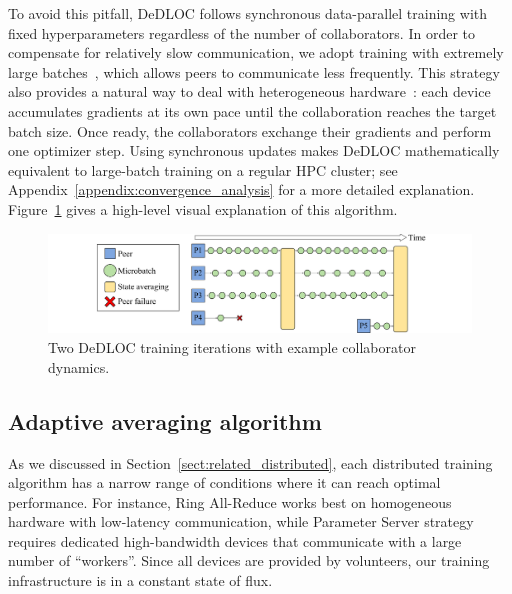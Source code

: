 To avoid this pitfall, DeDLOC follows synchronous data-parallel training with fixed hyperparameters regardless of the number of collaborators. In order to compensate for relatively slow communication, we adopt training with extremely large batches~\cite{lars,lamb,trainingtips,kaplan2020scaling,gpt3}, which allows peers to communicate less frequently. This strategy also provides a natural way to deal with heterogeneous hardware~\cite{ott2018scaling}: each device accumulates gradients at its own pace until the collaboration reaches the target batch size. Once ready, the collaborators exchange their gradients and perform one optimizer step. Using synchronous updates makes DeDLOC mathematically equivalent to large-batch training on a regular HPC cluster; see Appendix~\ref{appendix:convergence_analysis} for a more detailed explanation. Figure~\ref{fig:collaborative_training} gives a high-level visual explanation of this algorithm.

\begin{figure}[b]
\vspace{-10pt}
    \centering
    \includegraphics[height=100px]{resources/dedloc.pdf}
    \vspace{-8pt}
    \caption{Two DeDLOC training iterations with example collaborator dynamics.}
    \label{fig:collaborative_training}
    \vspace{-12px}
\end{figure}

\subsection{Adaptive averaging algorithm}\label{sect:method_algorithm}

As we discussed in Section~\ref{sect:related_distributed}, each distributed training algorithm has a narrow range of conditions where it can reach optimal performance. For instance, Ring All-Reduce works best on homogeneous hardware with low-latency communication, while Parameter Server strategy requires dedicated high-bandwidth devices that communicate with a large number of ``workers''. Since all devices are provided by volunteers, our training infrastructure is in a constant state of flux.

